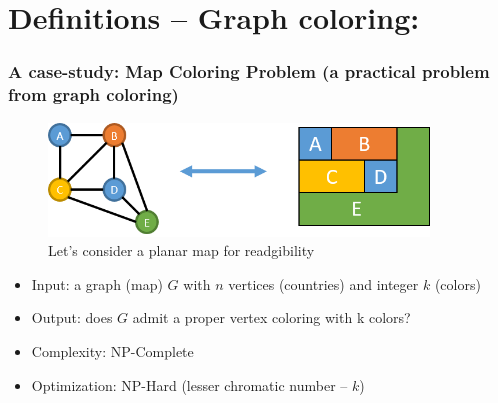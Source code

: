 \documentclass{beamer}
\begin{document}

\section{Definitions -- Graph coloring:}
\begin{frame}[fragile] 
	\frametitle{A case-study: Map Coloring Problem (a practical problem from graph coloring)}
		
	
\begin{figure}[tbp]
  \centering
	 \includegraphics[width=0.9\textwidth , height=0.3\textheight] {graph_coloring_equivalence.png}
  \caption{Let's consider a planar map for readgibility}
	
	\end{figure}
{\small	
\begin{block}{}
  \begin{itemize}
  \item Input: a graph (map) $G$ with $n$ vertices (countries) and  integer $k$ (colors)
  \item Output: does $G$ admit a proper vertex coloring with k colors?
  \item Complexity:	NP-Complete
  \item Optimization: NP-Hard (lesser chromatic number -- $k$)
     \end{itemize}
 \end{block}
}

\end{frame}
\end{document}
